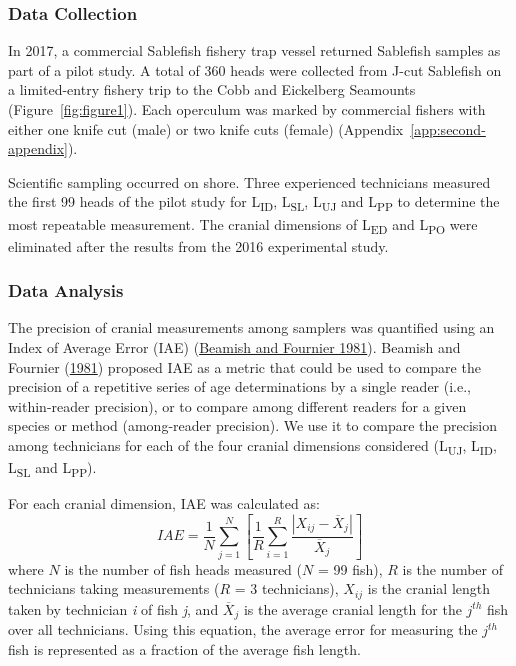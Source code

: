 \documentclass[12pt]{article}\usepackage[]{graphicx}\usepackage[]{color}
\begin{document}
\hypertarget{data-collection-1}{%
\subsubsection{Data Collection}\label{data-collection-1}}

In 2017, a commercial Sablefish fishery trap vessel returned Sablefish samples as part of a pilot study. A total of 360 heads were collected from J-cut Sablefish on a limited-entry fishery trip to the Cobb and Eickelberg Seamounts (Figure~\ref{fig:figure1}). Each operculum was marked by commercial fishers with either one knife cut (male) or two knife cuts (female) (Appendix~\ref{app:second-appendix}).

Scientific sampling occurred on shore. Three experienced technicians measured the first 99 heads of the pilot study for L\textsubscript{ID}, L\textsubscript{SL}, L\textsubscript{UJ} and L\textsubscript{PP} to determine the most repeatable measurement. The cranial dimensions of L\textsubscript{ED} and L\textsubscript{PO} were eliminated after the results from the 2016 experimental study.

\hypertarget{data-analysis-1}{%
\subsubsection{Data Analysis}\label{data-analysis-1}}

The precision of cranial measurements among samplers was quantified using an Index of Average Error (IAE) (\protect\hyperlink{ref-Beamish1981}{Beamish and Fournier 1981}). Beamish and Fournier (\protect\hyperlink{ref-Beamish1981}{1981}) proposed IAE as a metric that could be used to compare the precision of a repetitive series of age determinations by a single reader (i.e., within-reader precision), or to compare among different readers for a given species or method (among-reader precision). We use it to compare the precision among technicians for each of the four cranial dimensions considered (L\textsubscript{UJ}, L\textsubscript{ID}, L\textsubscript{SL} and L\textsubscript{PP}).

For each cranial dimension, IAE was calculated as: \[
IAE=\frac{1}{N}\sum_{j = 1}^{N}\left[\frac{1}{R}\sum_{i = 1}^{R}\frac{|X_{ij} - \overline{X}_j|}{\overline{X}_j}\right]
\] where \(N\) is the number of fish heads measured (\(N\) = 99 fish), \(R\) is the number of technicians taking measurements (\(R\) = 3 technicians), \(X_{ij}\) is the cranial length taken by technician \emph{i} of fish \emph{j}, and \({\overline{X}_j}\) is the average cranial length for the \(j^{th}\) fish over all technicians. Using this equation, the average error for measuring the \(j^{th}\) fish is represented as a fraction of the average fish length.
\end{document}
